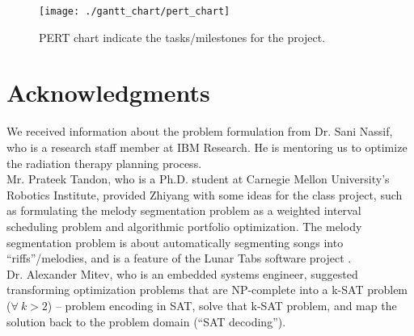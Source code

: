 \documentclass[letter,12pt]{article}
\begin{document}
\begin{figure}[h]
\centering 
\texttt{[image: ./gantt\_chart/pert\_chart]}
\caption{PERT chart indicate the tasks/milestones for the project.}
\label{fig:pertchart}
\end{figure}




\section*{Acknowledgments}
\label{sec:acknowledgments}

We received information about the problem formulation from Dr. Sani Nassif, who is a research staff member at IBM Research. He is mentoring us to optimize the radiation therapy planning process. \\

Mr. Prateek Tandon, who is a Ph.D. student at Carnegie Mellon University's Robotics Institute, provided Zhiyang with some ideas for the class project, such as formulating the melody segmentation problem as a weighted interval scheduling problem and algorithmic portfolio optimization. The melody segmentation problem is about automatically segmenting songs into ``riffs''/melodies, and is a feature of the Lunar Tabs software project \cite{Tandon2012}. \\

Dr. Alexander Mitev, who is an embedded systems engineer, suggested transforming optimization problems that are NP-complete into a k-SAT problem ($\forall\ k > 2$) -- problem encoding in SAT, solve that k-SAT problem, and map the solution back to the problem domain (``SAT decoding'').
	













{\linespread{1}


}
\end{document}
